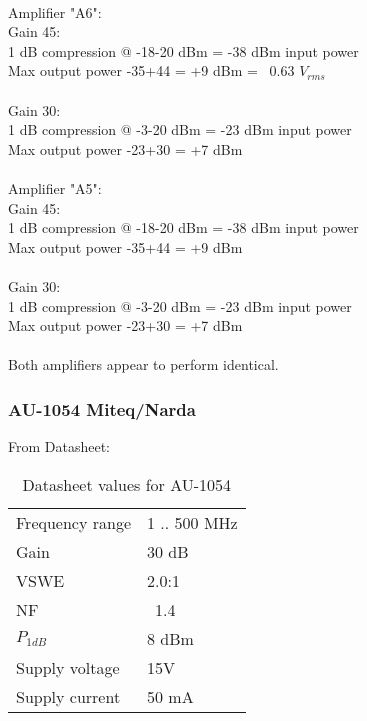 \documentclass{article}
\begin{document}
\paragraph{}
Amplifier "A6":\\
    Gain 45: \\
    1 dB compression @ -18-20 dBm = -38 dBm input power \\
    Max output power -35+44 = +9 dBm =~ 0.63 $V_{rms}$ \\
    \\
    Gain 30: \\
    1 dB compression @ -3-20 dBm = -23 dBm input power \\
    Max output power -23+30 = +7 dBm \\

\paragraph{}
Amplifier "A5":\\
    Gain 45: \\
    1 dB compression @ -18-20 dBm = -38 dBm input power \\
    Max output power -35+44 = +9 dBm \\
    \\
    Gain 30: \\
    1 dB compression @ -3-20 dBm = -23 dBm input power \\
    Max output power -23+30 = +7 dBm \\

\paragraph{}
Both amplifiers appear to perform identical.

\subsubsection{AU-1054 Miteq/Narda}
From Datasheet:
\begin{table}[H]
    \begin{tabular}{l@{ = }l}
        Frequency range & 1 .. 500 MHz \\
        Gain & 30 dB \\ 
        VSWE & 2.0:1 \\
        NF & ~1.4 \\ 
        $ P_{1dB} $ & 8 dBm \\
        Supply voltage & 15V \\
        Supply current & 50 mA \\
    \end{tabular}
    \caption{Datasheet values for AU-1054}
    \label{tab:DS-AU-1054}
\end{table}
\end{document}
